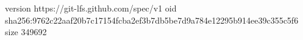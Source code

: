 version https://git-lfs.github.com/spec/v1
oid sha256:9762c22aaf20b7c17154fcba2ef3b7db5be7d9a784e12295b914ee39c355c5f6
size 349692
